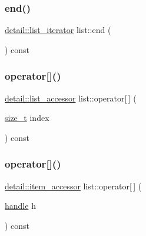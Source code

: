 \mbox{\label{classlist_a3de409f3499b5c3e27502a1bb79ea45a}} 
\subsubsection{\texorpdfstring{end()}{end()}}
{\footnotesize\ttfamily \mbox{\hyperlink{pytypes_8h_a185da221b77a3f194e5764f8b6babb1d}{detail\+::list\+\_\+iterator}} list\+::end (\begin{DoxyParamCaption}{ }\end{DoxyParamCaption}) const\hspace{0.3cm}{\ttfamily [inline]}}

\mbox{\label{classlist_aab85ae5bde0b7e32e2f31de39a80b6e8}} 
\subsubsection{\texorpdfstring{operator[]()}{operator[]()}\hspace{0.1cm}{\footnotesize\ttfamily [1/2]}}
{\footnotesize\ttfamily \mbox{\hyperlink{pytypes_8h_ad3aeae242a70c970305503390f417317}{detail\+::list\+\_\+accessor}} list\+::operator\mbox{[}$\,$\mbox{]} (\begin{DoxyParamCaption}\item[{\mbox{\hyperlink{detail_2common_8h_a801d6a451a01953ef8cbae6feb6a3638}{size\+\_\+t}}}]{index }\end{DoxyParamCaption}) const\hspace{0.3cm}{\ttfamily [inline]}}

\mbox{\label{classlist_ab71068000935a82764ec026dba392b1e}} 
\subsubsection{\texorpdfstring{operator[]()}{operator[]()}\hspace{0.1cm}{\footnotesize\ttfamily [2/2]}}
{\footnotesize\ttfamily \mbox{\hyperlink{pytypes_8h_a9907d3edf962653e33d36bccc8b8a268}{detail\+::item\+\_\+accessor}} list\+::operator\mbox{[}$\,$\mbox{]} (\begin{DoxyParamCaption}\item[{\mbox{\hyperlink{classhandle}{handle}}}]{h }\end{DoxyParamCaption}) const\hspace{0.3cm}{\ttfamily [inline]}}

